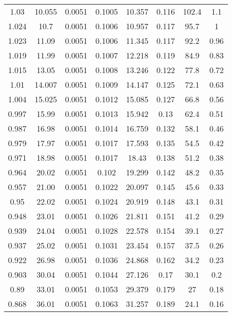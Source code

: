 \documentclass[dvipsnames, svgnames,a4paper,11pt]{article}
\begin{document}
\begin{longtable}{|c|c|c|c|c|c|c|c|}
                    \hline
                    1.03  & 10.055 & 0.0051 & 0.1005 & 10.357 & 0.116 & 102.4 & 1.1 \\
                    1.024 & 10.7 & 0.0051 & 0.1006 & 10.957 & 0.117 & 95.7 & 1 \\
                    1.023 & 11.09 & 0.0051 & 0.1006 & 11.345 & 0.117 & 92.2 & 0.96 \\
                    1.019 & 11.99 & 0.0051 & 0.1007 & 12.218 & 0.119 & 84.9 & 0.83 \\
                    1.015 & 13.05 & 0.0051 & 0.1008 & 13.246 & 0.122 & 77.8 & 0.72 \\
                    1.01  & 14.007 & 0.0051 & 0.1009 & 14.147 & 0.125 & 72.1 & 0.63 \\
                    1.004 & 15.025 & 0.0051 & 0.1012 & 15.085 & 0.127 & 66.8 & 0.56 \\
                    0.997 & 15.99 & 0.0051 & 0.1013 & 15.942 & 0.13 & 62.4 & 0.51 \\
                    0.987 & 16.98 & 0.0051 & 0.1014 & 16.759 & 0.132 & 58.1 & 0.46 \\
                    0.979 & 17.97 & 0.0051 & 0.1017 & 17.593 & 0.135 & 54.5 & 0.42 \\
                    0.971 & 18.98 & 0.0051 & 0.1017 & 18.43 & 0.138 & 51.2 & 0.38 \\
                    0.964 & 20.02 & 0.0051 & 0.102 & 19.299 & 0.142 & 48.2 & 0.35 \\
                    0.957 & 21.00 & 0.0051 & 0.1022 & 20.097 & 0.145 & 45.6 & 0.33 \\
                    0.95  & 22.02 & 0.0051 & 0.1024 & 20.919 & 0.148 & 43.1 & 0.31 \\
                    0.948 & 23.01 & 0.0051 & 0.1026 & 21.811 & 0.151 & 41.2 & 0.29 \\
                    0.939 & 24.04 & 0.0051 & 0.1028 & 22.578 & 0.154 & 39.1 & 0.27 \\
                    0.937 & 25.02 & 0.0051 & 0.1031 & 23.454 & 0.157 & 37.5 & 0.26 \\
                    0.922 & 26.98 & 0.0051 & 0.1036 & 24.868 & 0.162 & 34.2 & 0.23 \\
                    0.903 & 30.04 & 0.0051 & 0.1044 & 27.126 & 0.17 & 30.1 & 0.2 \\
                    0.89  & 33.01 & 0.0051 & 0.1053 & 29.379 & 0.179 & 27 & 0.18 \\
                    0.868 & 36.01 & 0.0051 & 0.1063 & 31.257 & 0.189 & 24.1 & 0.16 \\

\end{longtable}
\end{document}
